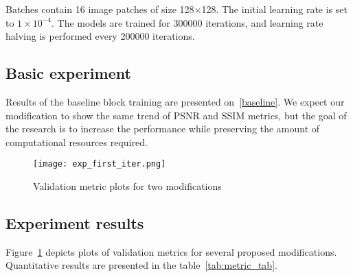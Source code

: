 \documentclass{article}
\begin{document}
Batches contain 16 image patches of size 128×128. The initial learning rate is set to $1\times 10^{-4}$. The models are trained for 300000 iterations, and learning rate halving is performed every 200000 iterations.


\subsection{Basic experiment}
Results of the baseline block training are presented on~\ref{baseline}. We expect our modification to show the same trend of PSNR and SSIM metrics, but the goal of the research is to increase the performance while preserving the amount of computational resources required.

\begin{figure}[t]
\caption{Validation metric plots for two modifications}
\centering
\texttt{[image: exp\_first\_iter.png]}
\label{first_iter}
\end{figure}

\subsection{Experiment results}
Figure~\ref{first_iter} depicts plots of validation metrics for several proposed modifications. Quantitative results are presented in the table~\ref{tab:metric_tab}. 
\end{document}
